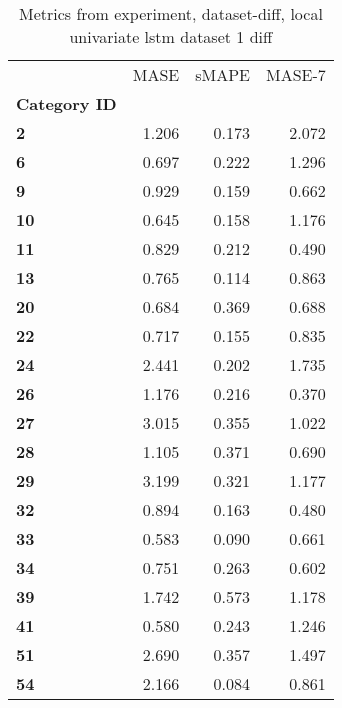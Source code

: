 \begin{table}[h]
\centering
\caption{Metrics from experiment, dataset-diff, local univariate lstm dataset 1 diff}
\label{table:local-univariate-lstm-dataset-1-diff-dataset-diff}
\begin{tabular}{lrrr}
\toprule
{} &   MASE &  sMAPE &  MASE-7 \\
\textbf{Category ID} &        &        &         \\
\midrule
\textbf{2          } &  1.206 &  0.173 &   2.072 \\
\textbf{6          } &  0.697 &  0.222 &   1.296 \\
\textbf{9          } &  0.929 &  0.159 &   0.662 \\
\textbf{10         } &  0.645 &  0.158 &   1.176 \\
\textbf{11         } &  0.829 &  0.212 &   0.490 \\
\textbf{13         } &  0.765 &  0.114 &   0.863 \\
\textbf{20         } &  0.684 &  0.369 &   0.688 \\
\textbf{22         } &  0.717 &  0.155 &   0.835 \\
\textbf{24         } &  2.441 &  0.202 &   1.735 \\
\textbf{26         } &  1.176 &  0.216 &   0.370 \\
\textbf{27         } &  3.015 &  0.355 &   1.022 \\
\textbf{28         } &  1.105 &  0.371 &   0.690 \\
\textbf{29         } &  3.199 &  0.321 &   1.177 \\
\textbf{32         } &  0.894 &  0.163 &   0.480 \\
\textbf{33         } &  0.583 &  0.090 &   0.661 \\
\textbf{34         } &  0.751 &  0.263 &   0.602 \\
\textbf{39         } &  1.742 &  0.573 &   1.178 \\
\textbf{41         } &  0.580 &  0.243 &   1.246 \\
\textbf{51         } &  2.690 &  0.357 &   1.497 \\
\textbf{54         } &  2.166 &  0.084 &   0.861 \\
\bottomrule
\end{tabular}
\end{table}

